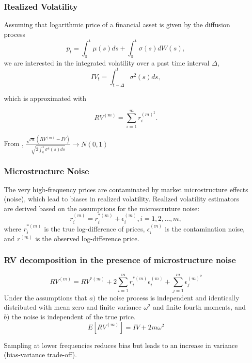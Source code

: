 \documentclass{beamer}
\begin{document}
\begin{frame}
	\frametitle{Realized Volatility}
	Assuming that logarithmic price of a financial asset is given by the diffusion process
	\begin{equation}
		p_t = \int_0^t \mu(s)ds + \int_0^t \sigma(s)dW(s),
	\end{equation}
	we are interested in the integrated volatility over a past time interval $\Delta$, 
	\begin{equation}
		IV_t = \int_{t-\Delta}^t \sigma^2(s)ds,
	\end{equation}
	
	\pause
	
	which is approximated with 
	
	\begin{equation}
		RV^{(m)} = \sum_{i=1}^m r_i^{(m)^2}.
	\end{equation}

	\pause

		From \cite{barndorff2002quadratic-variation}, $\frac{\sqrt{m} (RV^{(m)} - IV)}{\sqrt{2 \int_0^1 \sigma^4(s)ds}} \to N(0,1)$
\end{frame}

\begin{frame}
	\frametitle{Microstructure Noise}
	The very high-frequency prices are contaminated by market microstructure effects (noise), which lead to biases in realized volatility. Realized volatility estimators are derived based on the assumptions for the microscruture noise:
	\begin{equation}
		r_i^{(m)} = r_i^{*(m)} + \epsilon_i^{(m)}, i = 1,2, \ldots, m,
	\end{equation}
	where $r^{*(m)}_i$ is the true log-difference of prices, $\epsilon_i^{(m)}$ is the contamination noise, and $r^{(m)}$ is the observed log-difference price. 
\end{frame}

\begin{frame}
	\frametitle{RV decomposition in the presence of microstructure noise}
	\[ 
		RV^{(m)} = RV^{*(m)} + 2\sum_{i=1}^m r_i^{*(m)}\epsilon_i^{(m)} + \sum_{j=1}^m \epsilon_j^{(m)^2}
	\]
	Under the assumptions that $a)$ the noise process is independent and identically distributed with mean zero and finite variance $\omega^2$ and finite fourth moments, and $b)$ the noise is independent of the true price. 
	\begin{equation}
		E[ RV^{(m)} ] = IV + 2m\omega^2 
	\end{equation}

	\pause

	Sampling at lower frequencies reduces bias but leads to an increase in variance (bias-variance trade-off).
\end{frame}
\end{document}

